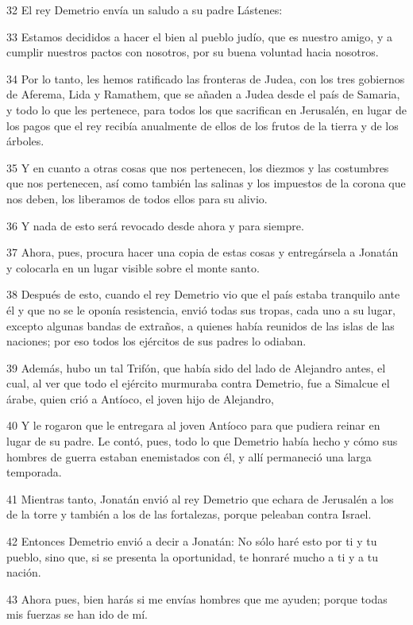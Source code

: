 \par 32 El rey Demetrio envía un saludo a su padre Lástenes:
\par 33 Estamos decididos a hacer el bien al pueblo judío, que es nuestro amigo, y a cumplir nuestros pactos con nosotros, por su buena voluntad hacia nosotros.
\par 34 Por lo tanto, les hemos ratificado las fronteras de Judea, con los tres gobiernos de Aferema, Lida y Ramathem, que se añaden a Judea desde el país de Samaria, y todo lo que les pertenece, para todos los que sacrifican en Jerusalén, en lugar de los pagos que el rey recibía anualmente de ellos de los frutos de la tierra y de los árboles.
\par 35 Y en cuanto a otras cosas que nos pertenecen, los diezmos y las costumbres que nos pertenecen, así como también las salinas y los impuestos de la corona que nos deben, los liberamos de todos ellos para su alivio.
\par 36 Y nada de esto será revocado desde ahora y para siempre.
\par 37 Ahora, pues, procura hacer una copia de estas cosas y entregársela a Jonatán y colocarla en un lugar visible sobre el monte santo.
\par 38 Después de esto, cuando el rey Demetrio vio que el país estaba tranquilo ante él y que no se le oponía resistencia, envió todas sus tropas, cada uno a su lugar, excepto algunas bandas de extraños, a quienes había reunidos de las islas de las naciones; por eso todos los ejércitos de sus padres lo odiaban.
\par 39 Además, hubo un tal Trifón, que había sido del lado de Alejandro antes, el cual, al ver que todo el ejército murmuraba contra Demetrio, fue a Simalcue el árabe, quien crió a Antíoco, el joven hijo de Alejandro,
\par 40 Y le rogaron que le entregara al joven Antíoco para que pudiera reinar en lugar de su padre. Le contó, pues, todo lo que Demetrio había hecho y cómo sus hombres de guerra estaban enemistados con él, y allí permaneció una larga temporada.
\par 41 Mientras tanto, Jonatán envió al rey Demetrio que echara de Jerusalén a los de la torre y también a los de las fortalezas, porque peleaban contra Israel.
\par 42 Entonces Demetrio envió a decir a Jonatán: No sólo haré esto por ti y tu pueblo, sino que, si se presenta la oportunidad, te honraré mucho a ti y a tu nación.
\par 43 Ahora pues, bien harás si me envías hombres que me ayuden; porque todas mis fuerzas se han ido de mí.

